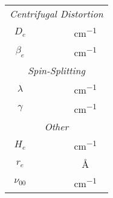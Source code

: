 \begin{table}[H]
\begin{tabular}{cccc}
        \multicolumn{4}{c}{\textit{Centrifugal Distortion}}                                                \\
        \cmidrule(lr){1-4}
        $D_e$           &                              &                              & \unit{cm^{-1}}   \\
        $\beta_e$       &                              &                              & \unit{cm^{-1}}   \\
        \multicolumn{4}{c}{\textit{Spin-Splitting}}                                                        \\
        \cmidrule(lr){1-4}
        $\lambda$         &                              &                              & \unit{cm^{-1}}   \\
        $\gamma$          &                              &                              & \unit{cm^{-1}}   \\
        \multicolumn{4}{c}{\textit{Other}}                                                                 \\
        \cmidrule(lr){1-4}
        $H_e$           &                              &                              & \unit{cm^{-1}}   \\
        $r_e$           &                              &                              & \unit{\angstrom} \\
        $\nu_{00}$        &                              &                              & \unit{cm^{-1}}   \\
        \bottomrule
    \end{tabular}
\end{table}
